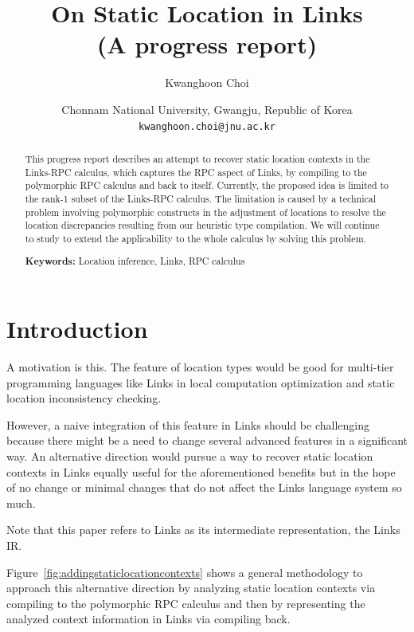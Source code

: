 \documentclass[a4paper]{article}
\title{On Static Location in Links\\(A progress report)}
\author{Kwanghoon Choi}
\date{
  Chonnam National University, Gwangju, Republic of Korea
  \\ \texttt{kwanghoon.choi@jnu.ac.kr}\\[2ex]%
}
\theoremstyle{plain}
\theoremstyle{definition}
\begin{document}
\maketitle
	
\begin{abstract}
%
This progress report describes an attempt to recover static location
contexts in the Links-RPC calculus, which captures the RPC aspect of
Links, by compiling to the polymorphic RPC calculus and back to
itself.
%  
Currently, the proposed idea is limited to the rank-1 subset of the
Links-RPC calculus.
%
The limitation is caused by a technical problem involving polymorphic
constructs in the adjustment of locations to resolve the location
discrepancies resulting from our heuristic type compilation.
%
We will continue to study to extend the applicability to the whole
calculus by solving this problem.

\noindent\textbf{Keywords:} Location inference, Links, RPC calculus
\end{abstract}

	
\section{Introduction}
\label{sec:intro}

A motivation is this.
%
The feature of location types would be good for multi-tier programming
languages like Links in local computation optimization and static
location inconsistency checking.

%

%
However, a naive integration of this feature in Links should be
challenging because there might be a need to change several advanced
features in a significant way.
%
An alternative direction would pursue a way to recover static location
contexts in Links equally useful for the aforementioned benefits but
in the hope of no change or minimal changes that do not affect the
Links language system so much.

%
Note that this paper refers to Links as its intermediate
representation, the Links IR.

%
Figure~\ref{fig:addingstaticlocationcontexts} shows a general
methodology to approach this alternative direction by analyzing static
location contexts via compiling to the polymorphic RPC calculus and
then by representing the analyzed context information in Links via
compiling back.
\end{document}
